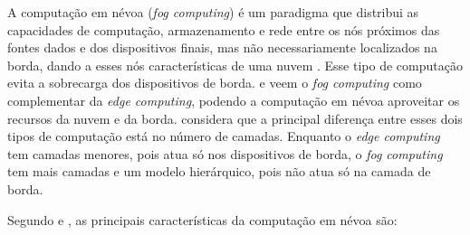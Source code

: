 A computação em névoa (\emph{fog computing}) é um paradigma que distribui
as capacidades de computação, armazenamento e rede entre os nós próximos das fontes dados
e dos dispositivos finais, mas não necessariamente localizados na borda,
dando a esses nós características de uma nuvem
\cite{Bonomi2012,Dastjerdi2016,IEEECommunicationsSociety2018}.
Esse tipo de computação evita a sobrecarga dos dispositivos de borda.
 e
 veem o \emph{fog computing} como complementar da
\emph{edge computing}, podendo a computação em névoa aproveitar os recursos da
nuvem e da borda.  considera que a
principal diferença entre esses dois tipos de computação está no número de
camadas. Enquanto o \emph{edge computing} tem camadas menores, pois atua só nos
dispositivos de borda, o \emph{fog computing} tem mais camadas e um modelo
hierárquico, pois não atua só na camada de borda.

Segundo  e , as principais
características da computação em névoa são:

